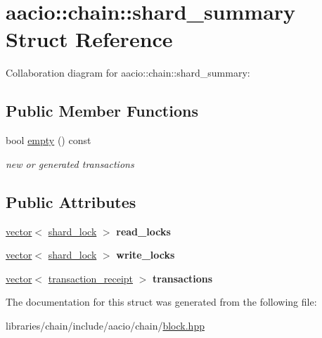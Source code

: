 \hypertarget{structaacio_1_1chain_1_1shard__summary}{}\section{aacio\+:\+:chain\+:\+:shard\+\_\+summary Struct Reference}
\label{structaacio_1_1chain_1_1shard__summary}


Collaboration diagram for aacio\+:\+:chain\+:\+:shard\+\_\+summary\+:
\subsection*{Public Member Functions}
\begin{DoxyCompactItemize}
\item 
\mbox{\label{structaacio_1_1chain_1_1shard__summary_a0b75d7e8f53929a65597de1c10c0bbef}} 
bool \mbox{\hyperlink{structaacio_1_1chain_1_1shard__summary_a0b75d7e8f53929a65597de1c10c0bbef}{empty}} () const
\begin{DoxyCompactList}\small\item\em new or generated transactions \end{DoxyCompactList}\end{DoxyCompactItemize}
\subsection*{Public Attributes}
\begin{DoxyCompactItemize}
\item 
\mbox{\label{structaacio_1_1chain_1_1shard__summary_adc5bef645079511c74e8541c36f6ca45}} 
\mbox{\hyperlink{classstd_1_1vector}{vector}}$<$ \mbox{\hyperlink{structaacio_1_1chain_1_1shard__lock}{shard\+\_\+lock}} $>$ {\bfseries read\+\_\+locks}
\item 
\mbox{\label{structaacio_1_1chain_1_1shard__summary_a97161e02bd43b5f0ee9eac8513b3463f}} 
\mbox{\hyperlink{classstd_1_1vector}{vector}}$<$ \mbox{\hyperlink{structaacio_1_1chain_1_1shard__lock}{shard\+\_\+lock}} $>$ {\bfseries write\+\_\+locks}
\item 
\mbox{\label{structaacio_1_1chain_1_1shard__summary_a514f0e8500732412f1fde03f160492a3}} 
\mbox{\hyperlink{classstd_1_1vector}{vector}}$<$ \mbox{\hyperlink{structaacio_1_1chain_1_1transaction__receipt}{transaction\+\_\+receipt}} $>$ {\bfseries transactions}
\end{DoxyCompactItemize}


The documentation for this struct was generated from the following file\+:\begin{DoxyCompactItemize}
\item 
libraries/chain/include/aacio/chain/\mbox{\hyperlink{block_8hpp}{block.\+hpp}}\end{DoxyCompactItemize}
